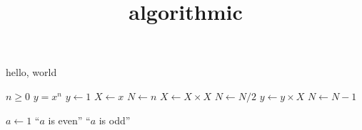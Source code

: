 \documentclass{amsart}
\title{algorithmic}
\begin{document}
\maketitle

hello, world

\begin{algorithmic}[1]
\REQUIRE $n \geq 0$
\ENSURE $y = x^n$
\STATE $y \leftarrow 1$
\STATE $X \leftarrow x$
\STATE $N \leftarrow n$
\STATE $X \leftarrow X \times X$
\STATE $N \leftarrow N / 2$
\ELSE[$N$ is odd]
\STATE $y \leftarrow y \times X$
\STATE $N \leftarrow N - 1$
\ENDIF
\ENDWHILE
\end{algorithmic}

\begin{algorithmic}[1]
  \STATE $a \leftarrow 1$
  \PRINT ``$a$ is even''
  \ELSE
  \PRINT ``$a$ is odd''
\ENDIF
\end{algorithmic}
\end{document}
